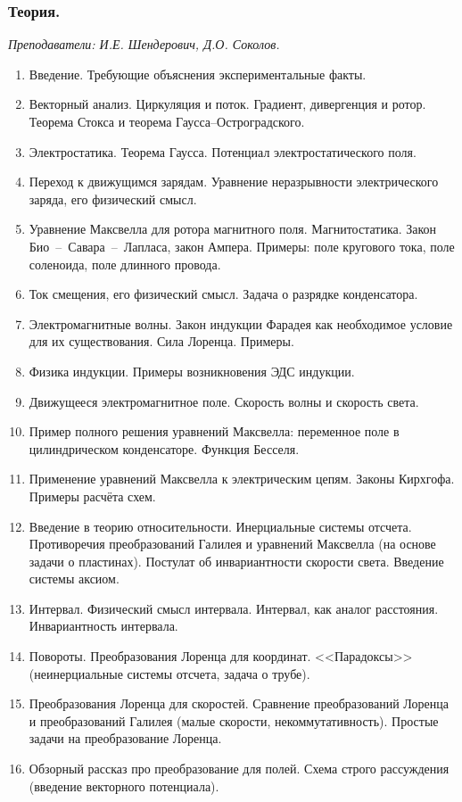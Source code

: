 \documentclass[11pt]{article}
\newlength{\h}
\newlength{\x}
\begin{document}
\subsubsection{Теория.}
\label{sec:th11}

\textit{Преподаватели: И.Е. Шендерович, Д.О. Соколов.}

\begin{enumerate}
\item Введение. Требующие объяснения экспериментальные факты.
\item Векторный анализ. Циркуляция и поток. Градиент, дивергенция и
  ротор. Теорема Стокса и теорема Гаусса--Остроградского.
\item Электростатика. Теорема Гаусса. Потенциал электростатического
  поля.
\item Переход к движущимся зарядам. Уравнение неразрывности
  электрического заряда, его физический смысл.
\item Уравнение Максвелла для ротора магнитного
  поля. Магнитостатика. Закон Био~--~Савара~--~Лапласа, закон
  Ампера. Примеры: поле кругового тока, поле соленоида, поле длинного
  провода.
\item Ток смещения, его физический смысл. Задача о разрядке
  конденсатора.
\item Электромагнитные волны. Закон индукции Фарадея как необходимое
  условие для их существования. Сила Лоренца. Примеры.
\item Физика индукции. Примеры возникновения ЭДС индукции.
\item Движущееся электромагнитное поле. Скорость волны и скорость
  света.
\item Пример полного решения уравнений Максвелла: переменное поле в
  цилиндрическом конденсаторе. Функция Бесселя.
\item Применение уравнений Максвелла к электрическим цепям. Законы
  Кирхгофа. Примеры расчёта схем.
\item Введение в теорию относительности. Инерциальные системы
  отсчета. Противоречия преобразований Галилея и уравнений Максвелла
  (на основе задачи о пластинах). Постулат об инвариантности скорости
  света. Введение системы аксиом.
\item Интервал. Физический смысл интервала. Интервал, как аналог
  расстояния. Инвариантность интервала.
\item Повороты. Преобразования Лоренца для координат. <<Парадоксы>>
  (неинерциальные системы отсчета, задача о трубе).
\item Преобразования Лоренца для скоростей. Сравнение преобразований
  Лоренца и преобразований Галилея (малые скорости,
  некоммутативность). Простые задачи на преобразование Лоренца.
\item Обзорный рассказ про преобразование для полей. Схема
  строго рассуждения (введение векторного потенциала).
\end{enumerate}
\end{document}
